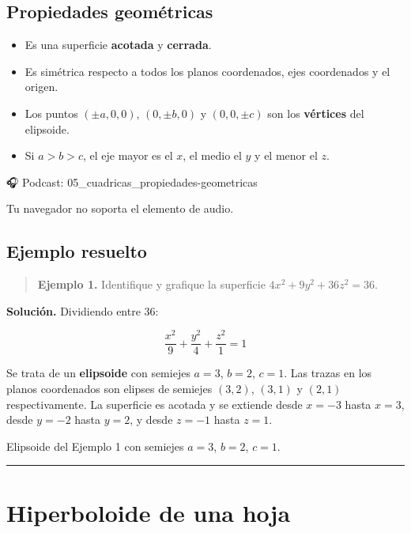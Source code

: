 \documentclass[
]{book}
\providecommand{\tightlist}{%
  \setlength{\itemsep}{0pt}\setlength{\parskip}{0pt}}
\begin{document}
\subsection{Propiedades geométricas}\label{propiedades-geomuxe9tricas-1}

\begin{itemize}
\tightlist
\item
  Es una superficie \textbf{acotada} y \textbf{cerrada}.
\item
  Es simétrica respecto a todos los planos coordenados, ejes coordenados y el origen.
\item
  Los puntos \((\pm a, 0, 0)\), \((0, \pm b, 0)\) y \((0, 0, \pm c)\) son los \textbf{vértices} del elipsoide.
\item
  Si \(a > b > c\), el eje mayor es el \(x\), el medio el \(y\) y el menor el \(z\).
\end{itemize}

🎧 Podcast: 05\_cuadricas\_propiedades-geometricas

Tu navegador no soporta el elemento de audio.

\subsection{Ejemplo resuelto}\label{ejemplo-resuelto-16}

\begin{quote}
\textbf{Ejemplo 1.} Identifique y grafique la superficie \(4x^2 + 9y^2 + 36z^2 = 36\).
\end{quote}

\textbf{Solución.} Dividiendo entre 36:

\[
\frac{x^2}{9} + \frac{y^2}{4} + \frac{z^2}{1} = 1
\]

Se trata de un \textbf{elipsoide} con semiejes \(a = 3\), \(b = 2\), \(c = 1\). Las trazas en los planos coordenados son elipses de semiejes \((3, 2)\), \((3, 1)\) y \((2, 1)\) respectivamente. La superficie es acotada y se extiende desde \(x = -3\) hasta \(x = 3\), desde \(y = -2\) hasta \(y = 2\), y desde \(z = -1\) hasta \(z = 1\).

\label{fig:elipsoide-ejemplo}Elipsoide del Ejemplo 1 con semiejes \(a = 3\), \(b = 2\), \(c = 1\).

\begin{center}\rule{0.5\linewidth}{0.5pt}\end{center}

\section{Hiperboloide de una hoja}\label{hiperboloide-de-una-hoja}
\end{document}
